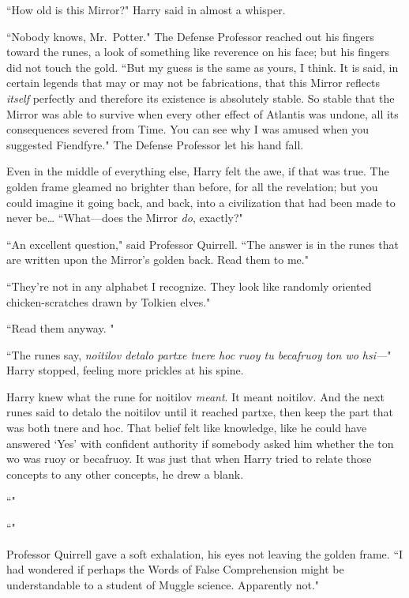 ``How old is this Mirror?" Harry said in almost a whisper.

``Nobody knows, Mr.~Potter." The Defense Professor reached out his fingers toward the runes, a look of something like reverence on his face; but his fingers did not touch the gold. ``But my guess is the same as yours, I think. It is said, in certain legends that may or may not be fabrications, that this Mirror reflects \emph{itself} perfectly and therefore its existence is absolutely stable. So stable that the Mirror was able to survive when every other effect of Atlantis was undone, all its consequences severed from Time. You can see why I was amused when you suggested Fiendfyre." The Defense Professor let his hand fall.

Even in the middle of everything else, Harry felt the awe, if that was true. The golden frame gleamed no brighter than before, for all the revelation; but you could imagine it going back, and back, into a civilization that had been made to never be{\ldots} ``What---does the Mirror \emph{do}, exactly?"

``An excellent question," said Professor Quirrell. ``The answer is in the runes that are written upon the Mirror's golden back. Read them to me."

``They're not in any alphabet I recognize. They look like randomly oriented chicken-scratches drawn by Tolkien elves."

``Read them anyway. "

``The runes say, \emph{noitilov detalo partxe tnere hoc ruoy tu becafruoy ton wo hsi---}" Harry stopped, feeling more prickles at his spine.

Harry knew what the rune for noitilov \emph{meant}. It meant noitilov. And the next runes said to detalo the noitilov until it reached partxe, then keep the part that was both tnere and hoc. That belief felt like knowledge, like he could have answered `Yes' with confident authority if somebody asked him whether the ton wo was ruoy or becafruoy. It was just that when Harry tried to relate those concepts to any other concepts, he drew a blank.

``"

``"

Professor Quirrell gave a soft exhalation, his eyes not leaving the golden frame. ``I had wondered if perhaps the Words of False Comprehension might be understandable to a student of Muggle science. Apparently not."

